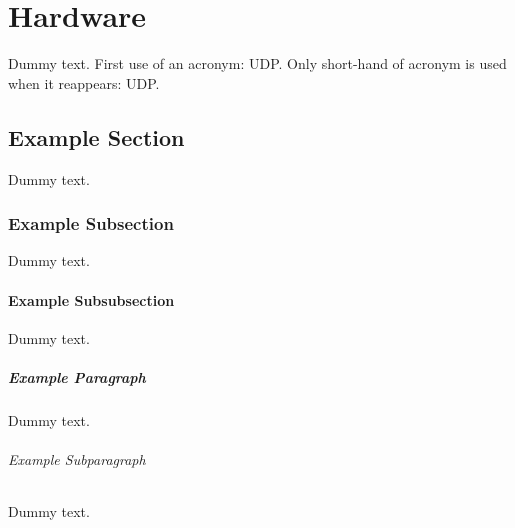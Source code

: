 \chapter{Hardware}

Dummy text. First use of an acronym: \ac{UDP}. Only short-hand of acronym is used when it reappears: \ac{UDP}.

\section{Example Section}

Dummy text.

\subsection{Example Subsection}

Dummy text.

\subsubsection{Example Subsubsection}

Dummy text.

\paragraph{Example Paragraph}

Dummy text.

\subparagraph{Example Subparagraph}

Dummy text. 
